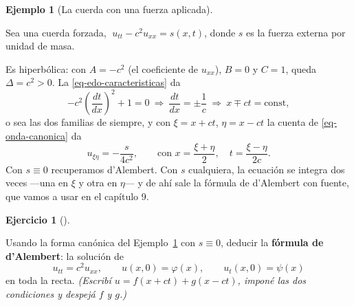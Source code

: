 \documentclass[
  spanish,
  a4paper,
]{scrbook}
\theoremstyle{definition}
\theoremstyle{plain}
\theoremstyle{definition}
\newtheorem{example}{Ejemplo}[chapter]
\theoremstyle{plain}
\theoremstyle{definition}
\newtheorem{exercise}{Ejercicio}[chapter]
\theoremstyle{remark}
\begin{document}
\begin{example}[La cuerda con una fuerza
aplicada]\protect\hypertarget{exm-onda-fuente}{}\label{exm-onda-fuente}

Sea una cuerda forzada, \(\;u_{tt} - c^2u_{xx} = s(x,t)\), donde \(s\)
es la fuerza externa por unidad de masa.

Es hiperbólica: con \(A = -c^2\) (el coeficiente de \(u_{xx}\)), \(B=0\)
y \(C=1\), queda \(\Delta = c^2 > 0\). La \ref{eq-edo-caracteristicas}
da
\[-c^2\left(\frac{dt}{dx}\right)^2 + 1 = 0 \ \Longrightarrow\ \frac{dt}{dx} = \pm\frac{1}{c}
\ \Longrightarrow\ x \mp ct = \text{const},\] o sea las dos familias de
siempre, y con \(\xi = x+ct\), \(\eta = x-ct\) la cuenta de
\ref{eq-onda-canonica} da \[
u_{\xi\eta} = -\frac{s}{4c^2}, \qquad\text{con } x = \frac{\xi+\eta}{2}, \quad t = \frac{\xi-\eta}{2c} .
\] Con \(s\equiv 0\) recuperamos d'Alembert. Con \(s\) cualquiera, la
ecuación se integra dos veces ---una en \(\xi\) y otra en \(\eta\)--- y
de ahí sale la fórmula de d'Alembert con fuente, que vamos a usar en el
capítulo 9.

\end{example}

\begin{exercise}[]\protect\hypertarget{exr-dalembert}{}\label{exr-dalembert}

Usando la forma canónica del Ejemplo~\ref{exm-onda-fuente} con
\(s\equiv 0\), deducir la \textbf{fórmula de d'Alembert}: la solución de
\[u_{tt} = c^2u_{xx}, \qquad u(x,0) = \varphi(x), \qquad u_t(x,0) = \psi(x)\]
en toda la recta. \emph{(Escribí \(u = f(x+ct)+g(x-ct)\), imponé las dos
condiciones y despejá \(f\) y \(g\).)}

\end{exercise}
\end{document}
